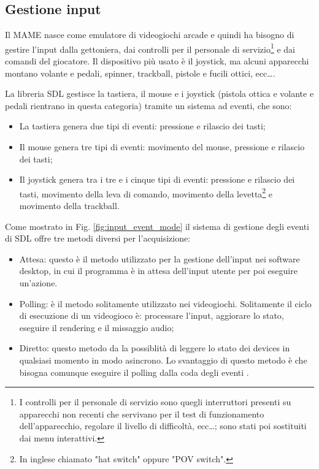 \subsection{Gestione input}
Il MAME nasce come emulatore di videogiochi arcade e quindi ha bisogno di gestire l'input dalla gettoniera, dai controlli per il personale di servizio\footnote{I controlli per il personale di servizio sono quegli interruttori presenti su apparecchi non recenti che servivano per il test di funzionamento dell'apparecchio, regolare il livello di difficoltà, ecc\dots; sono stati poi sostituiti dai menu interattivi.} e dai comandi del giocatore. Il dispositivo più usato è il joystick, ma alcuni apparecchi montano volante e pedali, spinner, trackball, pistole e fucili ottici, ecc\dots \parencite{Il_progetto_MAME}.

La libreria SDL gestisce la tastiera, il mouse e i joystick (pistola ottica e volante e pedali rientrano in questa categoria) tramite un sistema ad eventi, che sono:

\begin{itemize}	
	\item La tastiera genera due tipi di eventi: pressione e rilascio dei tasti;
	\item Il mouse genera tre tipi di eventi: movimento del mouse, pressione e rilascio dei tasti;
	\item Il joystick genera tra i tre e i cinque tipi di eventi: pressione e rilascio dei tasti, movimento della leva di comando, movimento della levetta\footnote{In inglese chiamato "hat switch" oppure "POV switch".} e movimento della trackball.
\end{itemize}

Come mostrato in Fig. \ref{fig:input_event_mode} il sistema di gestione degli eventi di SDL offre tre metodi diversi per l'acquisizione:

\begin{itemize}	
	\item Attesa: questo è il metodo utilizzato per la gestione dell'input nei software desktop, in cui il programma è in attesa dell'input utente per poi eseguire un'azione.
	\item Polling: è il metodo solitamente utilizzato nei videogiochi. Solitamente il ciclo di esecuzione di un videogioco è: processare l'input, aggiorare lo stato, eseguire il rendering e il missaggio audio;
	\item Diretto: questo metodo da la possiblità di leggere lo stato dei devices in qualsiasi momento in modo asincrono. Lo svantaggio di questo metodo è che bisogna comunque eseguire il polling dalla coda degli eventi \parencite{FocusOnSDL}.
\end{itemize}

